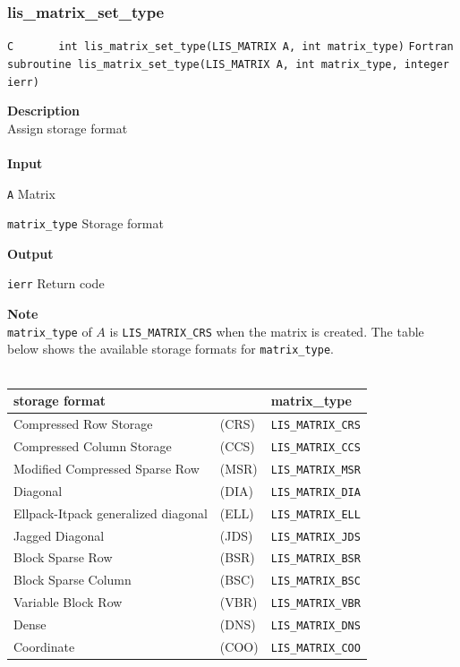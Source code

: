 \documentclass[a4paper]{article}
\newcommand{\namelistlabel}[1]{\mbox{#1}\hfill}
\newenvironment{namelist}[1]{%
 \begin{list}{}
  {\let\makelabel\namelistlabel
  \settowidth{\labelwidth}{#1}
  \setlength{\leftmargin}{1.1\labelwidth}}
}{%
\end{list}}
\begin{document}
  \subsubsection{lis\_matrix\_set\_type}
\begin{screen}
\verb|C       int lis_matrix_set_type(LIS_MATRIX A, int matrix_type)|
\verb|Fortran subroutine lis_matrix_set_type(LIS_MATRIX A, int matrix_type, integer ierr)|
\end{screen}
{\bf Description}\\
\indent
Assign storage format
\\ \\
\noindent
{\bf Input}
\begin{namelist}{XXXXXXXXXXXXXXXXXXXX}
\item[\tt A] Matrix
\item[\tt matrix\_type] Storage format
\end{namelist}
{\bf Output}
\begin{namelist}{XXXXXXXXXXXXXXXXXXXX}
\item[\tt ierr] Return code
\end{namelist}
\noindent
{\bf Note}\\
\indent
\verb+matrix_type+ of $A$ is \verb+LIS_MATRIX_CRS+ when the matrix is created. 
The table below shows the available storage formats for \verb+matrix_type+.
\\ \\
\begin{minipage}[t]{\textwidth}
\begin{center}
\begin{tabular}{lll}\hline\hline
storage format  & & matrix\_type \\ \hline
Compressed Row Storage & (CRS) & \verb|LIS_MATRIX_CRS| \\
Compressed Column Storage & (CCS) & \verb|LIS_MATRIX_CCS| \\
Modified Compressed Sparse Row & (MSR) & \verb|LIS_MATRIX_MSR| \\
Diagonal &(DIA) & \verb|LIS_MATRIX_DIA| \\
Ellpack-Itpack generalized diagonal &(ELL) & \verb|LIS_MATRIX_ELL| \\
Jagged Diagonal &(JDS) & \verb|LIS_MATRIX_JDS| \\
Block Sparse Row & (BSR) & \verb|LIS_MATRIX_BSR| \\
Block Sparse Column &(BSC) & \verb|LIS_MATRIX_BSC| \\
Variable Block Row &(VBR) & \verb|LIS_MATRIX_VBR| \\
Dense &	(DNS) & \verb|LIS_MATRIX_DNS| \\
Coordinate & (COO) & \verb|LIS_MATRIX_COO| \\
\hline         
\end{tabular}
\end{center}
\end{minipage}
\end{document}
